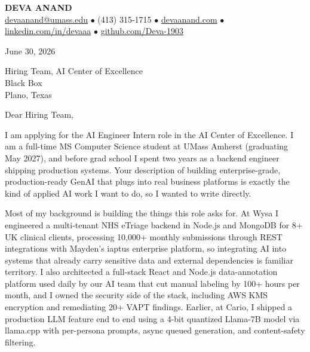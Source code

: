 \documentclass[letterpaper,11pt]{article}
\begin{document}
\begin{center}
    {\fontsize{18}{20}\selectfont\bfseries DEVA ANAND}\\ \vspace{3pt}
    {\small
    \href{mailto:devaanand@umass.edu}{devaanand@umass.edu}
    \enspace$\bullet$\enspace
    (413) 315-1715
    \enspace$\bullet$\enspace
    \href{https://devaanand.com}{devaanand.com}
    \enspace$\bullet$\enspace
    \href{https://linkedin.com/in/devaaa/}{linkedin.com/in/devaaa}
    \enspace$\bullet$\enspace
    \href{https://github.com/Deva-1903}{github.com/Deva-1903}}
\end{center}

\vspace{6pt}

June 30, 2026

Hiring Team, AI Center of Excellence \\
Black Box \\
Plano, Texas

\vspace{2pt}

Dear Hiring Team,

I am applying for the AI Engineer Intern role in the AI Center of Excellence. I am a full-time MS Computer Science student at UMass Amherst (graduating May 2027), and before grad school I spent two years as a backend engineer shipping production systems. Your description of building enterprise-grade, production-ready GenAI that plugs into real business platforms is exactly the kind of applied AI work I want to do, so I wanted to write directly.

Most of my background is building the things this role asks for. At Wysa I engineered a multi-tenant NHS eTriage backend in Node.js and MongoDB for 8+ UK clinical clients, processing 10,000+ monthly submissions through REST integrations with Mayden's iaptus enterprise platform, so integrating AI into systems that already carry sensitive data and external dependencies is familiar territory. I also architected a full-stack React and Node.js data-annotation platform used daily by our AI team that cut manual labeling by 100+ hours per month, and I owned the security side of the stack, including AWS KMS encryption and remediating 20+ VAPT findings. Earlier, at Cario, I shipped a production LLM feature end to end using a 4-bit quantized Llama-7B model via llama.cpp with per-persona prompts, async queued generation, and content-safety filtering.
\end{document}
